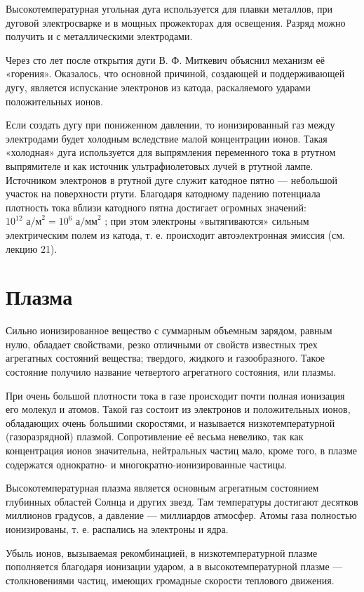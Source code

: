 \documentclass[a4paper,10pt]{book}
\begin{document}
Высокотемпературная угольная дуга используется для плавки металлов, при дуговой электросварке и в мощных прожекторах для освещения. Разряд можно получить и с металлическими электродами.

Через сто лет после открытия дуги В. Ф. Миткевич объяснил механизм её «горения». Оказалось, что основной причиной, создающей и поддерживающей дугу, является испускание электронов из катода, раскаляемого ударами положительных ионов.

Если создать дугу при пониженном давлении, то ионизированный газ между электродами будет холодным вследствие малой концентрации ионов. Такая «холодная» дуга используется для выпрямления переменного тока в ртутном выпрямителе и как источник ультрафиолетовых лучей в ртутной лампе. Источником электронов в ртутной дуге служит катодное пятно — небольшой участок на поверхности ртути. Благодаря катодному падению потенциала плотность тока вблизи катодного пятна достигает огромных значений: $10^{12}\textit{ а/м}^2 = 10^6\textit{ а/мм}^2$ ; при этом электроны «вытягиваются» сильным электрическим полем из катода, т. е. происходит автоэлектронная эмиссия (см. лекцию 21).

\section{Плазма}

Сильно ионизированное вещество с суммарным объемным зарядом, равным нулю, обладает свойствами, резко отличными от свойств известных трех агрегатных состояний вещества; твердого, жидкого и газообразного. Такое состояние получило название четвертого агрегатного состояния, или плазмы.

При очень большой плотности тока в газе происходит почти полная ионизация его молекул и атомов. Такой газ состоит из электронов и положительных ионов, обладающих очень большими скоростями, и называется низкотемпературной (газоразрядной) плазмой. Сопротивление её весьма невелико, так как концентрация ионов значительна, нейтральных частиц мало, кроме того, в плазме содержатся однократно- и многократно-ионизированные частицы.

Высокотемпературная плазма является основным агрегатным состоянием глубинных областей Солнца и других звезд. Там температуры достигают десятков миллионов градусов, а давление — миллиардов атмосфер. Атомы газа полностью ионизированы, т. е. распались на электроны и ядра.

Убыль ионов, вызываемая рекомбинацией, в низкотемпературной плазме пополняется благодаря ионизации ударом, а в высокотемпературной плазме — столкновениями частиц, имеющих громадные скорости теплового движения.
\end{document}
